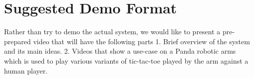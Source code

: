 \documentclass[letterpaper]{article} %
\theoremstyle{definition}
\begin{document}
\section{Suggested Demo Format}
Rather than try to demo the actual system, we would like to present a pre-prepared video that will have the following parts
1. Brief overview of the system and its main ideas. 2. Videos that show a use-case on a Panda robotic arms which is used to play various variants of tic-tac-toe played by the arm against a human player. 


%
%

\end{document}
